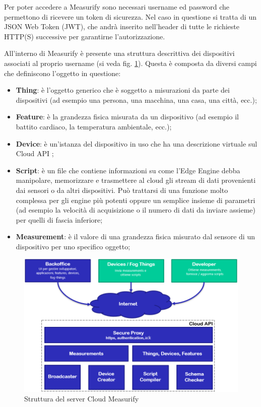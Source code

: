 Per poter accedere a Measurify sono necessari username ed password che permettono di ricevere un token di sicurezza. Nel caso in questione si tratta di un JSON Web Token (JWT), che andrà inserito nell'header di tutte le richieste HTTP(S) successive per garantirne l'autorizzazione.

All'interno di Measurify è presente una struttura descrittiva dei dispositivi associati al proprio username  (si veda fig. \ref{cloudAPI}). Questa è composta da diversi campi che definiscono l'oggetto in questione:

\begin{itemize}
	\item \textbf{Thing}: è  l'oggetto generico che è soggetto a misurazioni da parte dei dispositivi (ad esempio una persona, una macchina, una casa, una città, ecc.);
	\item \textbf{Feature}: è la grandezza fisica misurata da un dispositivo (ad esempio il battito cardiaco, la temperatura ambientale, ecc.);
	\item \textbf{Device}: è un'istanza del dispositivo in uso che ha una descrizione virtuale sul Cloud API ;
	\item \textbf{Script}: è un file che contiene informazioni su come l'Edge Engine debba manipolare, memorizzare e trasmettere al cloud gli stream di dati provenienti dai sensori o da altri dispositivi. Può trattarsi di una funzione molto complessa per gli engine più potenti oppure un semplice insieme di parametri (ad esempio la velocità di acquisizione o il numero di dati da inviare assieme) per quelli di fascia inferiore;
	\item \textbf{Measurement}: è il valore di una grandezza fisica misurato dal sensore
	di un dispositivo per uno specifico oggetto;
\end{itemize}

\begin{figure}[H]
	\centering
	\includegraphics[width=\linewidth]{pics/cloudAPI}
	\caption{Struttura del server Cloud Measurify}
	\label{cloudAPI}
\end{figure}

